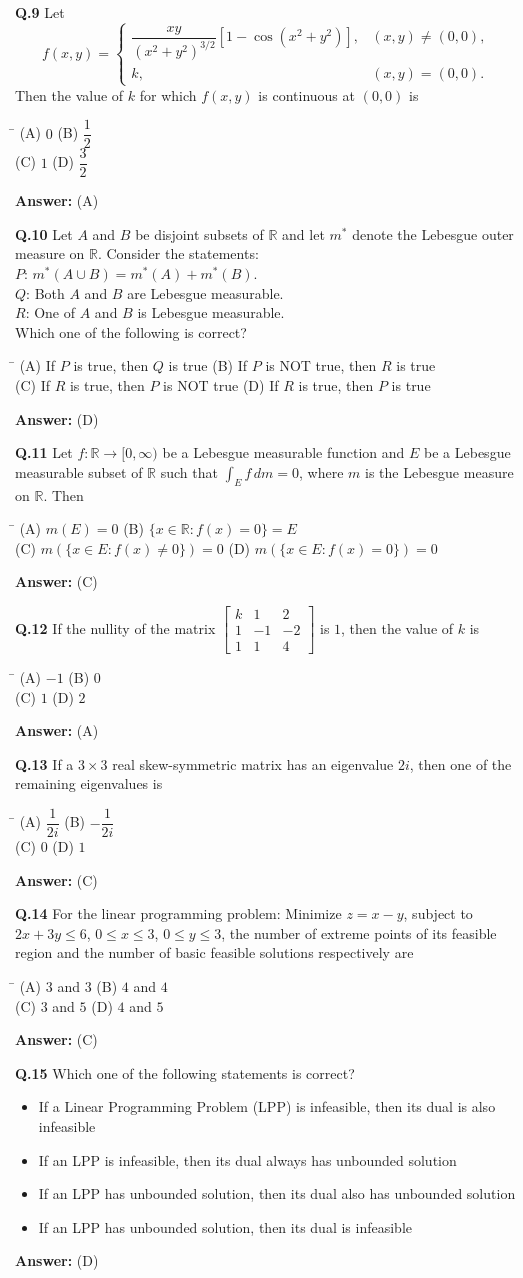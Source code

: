 \documentclass[11pt,a4paper]{article}
\newcommand{\optsfourA}[4]{%
  \begin{tabbing}
    \hspace{0.48\linewidth}\=\kill
    (A) #1 \> (B) #2 \\[2pt]
    (C) #3 \> (D) #4
  \end{tabbing}%
}
\newcommand{\optslistA}[4]{%
  \begin{itemize}
    \setlength{\itemsep}{2pt}\setlength{\parskip}{0pt}
    \item[(A)] #1
    \item[(B)] #2
    \item[(C)] #3
    \item[(D)] #4
  \end{itemize}%
}
\newcommand{\ans}[1]{\textbf{Answer:} #1\par\medskip}
\begin{document}
\textbf{Q.9} Let
\[
  f(x, y) = \begin{cases} \dfrac{xy}{(x^2 + y^2)^{3/2}}[1 - \cos(x^2 + y^2)], & (x, y) \ne (0, 0), \\ k, & (x, y) = (0, 0). \end{cases}
\]
Then the value of $k$ for which $f(x, y)$ is continuous at $(0, 0)$ is
\optsfourA{$0$}{$\dfrac{1}{2}$}{$1$}{$\dfrac{3}{2}$}
\ans{(A)}

\textbf{Q.10} Let $A$ and $B$ be disjoint subsets of $\mathbb{R}$ and let $m^*$ denote the Lebesgue outer measure on $\mathbb{R}$. Consider the statements:\\
$P$: $m^*(A \cup B) = m^*(A) + m^*(B)$.\\
$Q$: Both $A$ and $B$ are Lebesgue measurable.\\
$R$: One of $A$ and $B$ is Lebesgue measurable.\\
Which one of the following is correct?
\optsfourA{If $P$ is true, then $Q$ is true}{If $P$ is NOT true, then $R$ is true}{If $R$ is true, then $P$ is NOT true}{If $R$ is true, then $P$ is true}
\ans{(D)}

\textbf{Q.11} Let $f : \mathbb{R} \to [0, \infty)$ be a Lebesgue measurable function and $E$ be a Lebesgue measurable subset of $\mathbb{R}$ such that $\displaystyle\int_E f\,dm = 0$, where $m$ is the Lebesgue measure on $\mathbb{R}$. Then
\optsfourA{$m(E) = 0$}{$\{x \in \mathbb{R} : f(x) = 0\} = E$}{$m(\{x \in E : f(x) \ne 0\}) = 0$}{$m(\{x \in E : f(x) = 0\}) = 0$}
\ans{(C)}

\textbf{Q.12} If the nullity of the matrix $\begin{bmatrix} k & 1 & 2 \\ 1 & -1 & -2 \\ 1 & 1 & 4 \end{bmatrix}$ is $1$, then the value of $k$ is
\optsfourA{$-1$}{$0$}{$1$}{$2$}
\ans{(A)}

\textbf{Q.13} If a $3 \times 3$ real skew-symmetric matrix has an eigenvalue $2i$, then one of the remaining eigenvalues is
\optsfourA{$\dfrac{1}{2i}$}{$-\dfrac{1}{2i}$}{$0$}{$1$}
\ans{(C)}

\textbf{Q.14} For the linear programming problem: Minimize $z = x - y$, subject to $2x + 3y \le 6$, $0 \le x \le 3$, $0 \le y \le 3$, the number of extreme points of its feasible region and the number of basic feasible solutions respectively are
\optsfourA{$3$ and $3$}{$4$ and $4$}{$3$ and $5$}{$4$ and $5$}
\ans{(C)}

\textbf{Q.15} Which one of the following statements is correct?
\optslistA{If a Linear Programming Problem (LPP) is infeasible, then its dual is also infeasible}{If an LPP is infeasible, then its dual always has unbounded solution}{If an LPP has unbounded solution, then its dual also has unbounded solution}{If an LPP has unbounded solution, then its dual is infeasible}
\ans{(D)}
\end{document}
